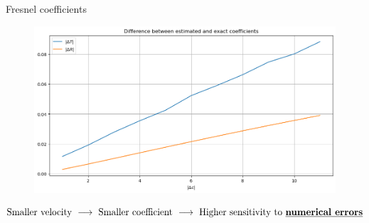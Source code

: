 \begin{frame}{Fresnel coefficients}
{\begin{minipage}{0.49\textwidth}
        \vspace{-0.2cm}

        \begin{figure}
            \centering
            \includegraphics[width=\textwidth]{Immagini/plot-difference-coefficients-c1>c2.png}
        \end{figure}
    \end{minipage}}

    \scriptsize

    \vspace{-0.1cm}

    \begin{equation*}
        \text{Smaller velocity} \ \longrightarrow \ \text{Smaller coefficient} \ \longrightarrow \ \text{Higher sensitivity to \textbf{\underline{numerical errors}}}
    \end{equation*}
\end{frame}

